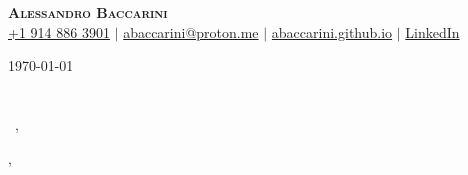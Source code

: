 \documentclass[12pt]{letter}
\begin{document}


\begin{center}
    \textbf{\Huge \scshape Alessandro Baccarini} \\ \vspace{1pt}
    \small \href{tel:19148863901}{ +1 914 886 3901}  
    $|$
    \href{mailto:abaccarini@proton.me}{{ abaccarini@proton.me}} 
    $|$
    \href{https://abaccarini.github.io/}{{ \url{abaccarini.github.io}}} 
    $|$
    \href{https://www.linkedin.com/in/alessandro-baccarini/}{{ LinkedIn}} 
\end{center}




\vspace{0.8in}

\today\\

\vspace{-0.1in}\recipient\\
\company\\

\vspace{-0.1in}\greeting\ \recipient,\\

\vspace{-0.1in}\setlength\parindent{24pt}
\noindent

\vspace{0.1in}

\begin{flushright}
\closer,\\
\myname\\
\mytitle
\end{flushright}
\end{document}
